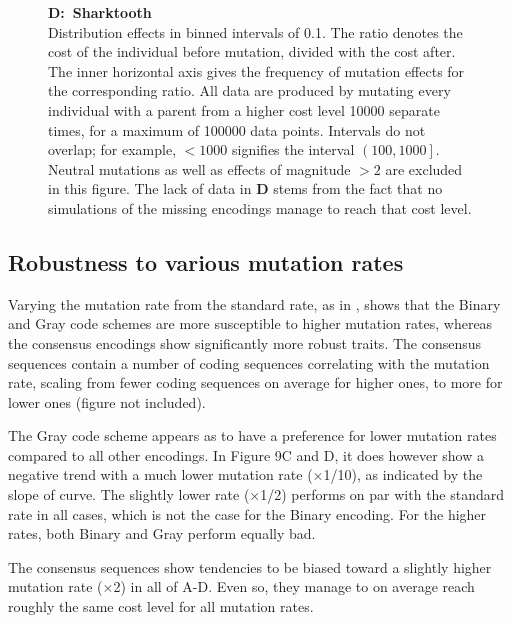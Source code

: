 \documentclass[a4paper,12pt]{article}
\theoremstyle{plain}
\theoremstyle{definition}
\begin{document}
\begin{figure}[H]
{         \textbf{D:~Sharktooth} \\
         \indent Distribution effects in binned intervals of
         0.1. The ratio denotes the cost of the individual before mutation,
         divided with the cost after.
         The inner horizontal axis gives the frequency
         of mutation effects for the corresponding ratio. All data are
         produced by mutating every individual with a parent from a higher
         cost level 10000 separate times, for a maximum of 100000 data points.
         Intervals do not overlap; for example, $\mathit{< 1000}$ signifies the
         interval $\left(100,1000\right]$. Neutral mutations as well as effects
         of magnitude $> 2$ are excluded in this figure. The lack of data in
         \textbf{D} stems from the fact that no simulations of the missing encodings manage to reach
   that cost level.}
      \label{fig:distribution}
   \end{figure}
   \pagebreak
      
   \subsection{Robustness to various mutation rates}
      Varying the mutation rate from the standard rate, as in
      , shows that the Binary and Gray code schemes 
      are more susceptible to higher mutation rates, whereas the consensus 
      encodings show significantly more robust traits. The consensus sequences
      contain a number of coding sequences correlating with the mutation rate,
      scaling from fewer coding sequences on average for higher ones, to
      more for lower ones (figure not included). 
      
      The Gray code scheme appears as to have a preference for lower
      mutation rates compared to all other encodings. In Figure 9C and D, it
      does however show a negative trend with a much lower mutation rate
      ($\times$1/10), as indicated by the slope of curve. The 
      slightly lower rate ($\times$1/2) performs on par with
      the standard rate in all cases, which is not the case for the Binary
      encoding. For the higher rates, both Binary and Gray perform equally bad. 

      The consensus sequences show tendencies to be biased toward a
      slightly higher mutation rate ($\times$2) in all of
      A-D. Even so, they manage to on average reach
      roughly the same cost level for all mutation rates. 
\end{document}
